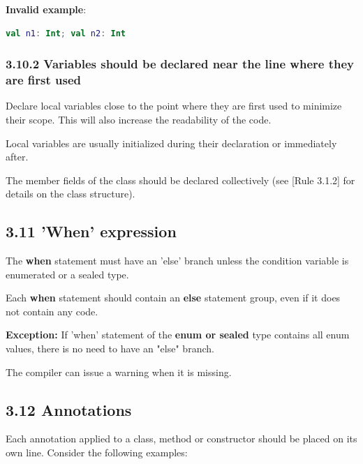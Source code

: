 \textbf{Invalid example}:

\begin{lstlisting}[language=Kotlin]
val n1: Int; val n2: Int
\end{lstlisting}


\subsubsection*{\textbf{3.10.2 Variables should be declared near the line where they are first used}}
\leavevmode\newline

\label{sec:3.10.2}

Declare local variables close to the point where they are first used to minimize their scope. This will also increase the readability of the code.

Local variables are usually initialized during their declaration or immediately after.

The member fields of the class should be declared collectively (see [Rule 3.1.2] for details on the class structure).



\subsection*{\textbf{3.11 'When' expression}}

\label{sec:3.11}



The \textbf{when} statement must have an 'else' branch unless the condition variable is enumerated or a sealed type.

Each \textbf{when} statement should contain an \textbf{else} statement group, even if it does not contain any code.



\textbf{Exception:} If 'when' statement of the \textbf{enum or sealed} type contains all enum values, there is no need to have an "else" branch.

The compiler can issue a warning when it is missing.



\subsection*{\textbf{3.12 Annotations}}

\label{sec:3.12}



Each annotation applied to a class, method or constructor should be placed on its own line. Consider the following examples:

